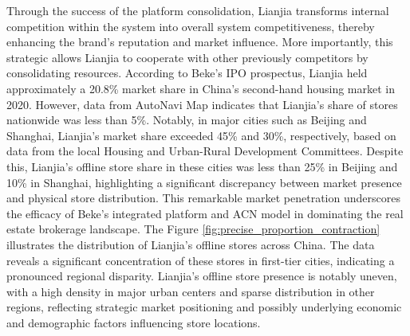\documentclass[11pt]{article}
\begin{document}
Through the success of the platform consolidation, Lianjia transforms internal competition within the system into overall system competitiveness, thereby enhancing the brand's reputation and market influence. More importantly, this strategic allows Lianjia to cooperate with other previously competitors by consolidating resources. According to Beke's IPO prospectus, Lianjia held approximately a 20.8\% market share in China's second-hand housing market in 2020. However, data from AutoNavi Map indicates that Lianjia's share of stores nationwide was less than 5\%. Notably, in major cities such as Beijing and Shanghai, Lianjia's market share exceeded 45\% and 30\%, respectively, based on data from the local Housing and Urban-Rural Development Committees. Despite this, Lianjia's offline store share in these cities was less than 25\% in Beijing and 10\% in Shanghai, highlighting a significant discrepancy between market presence and physical store distribution. This remarkable market penetration underscores the efficacy of Beke's integrated platform and ACN model in dominating the real estate brokerage landscape. The Figure \ref{fig:precise_proportion_contraction} illustrates the distribution of Lianjia's offline stores across China. The data reveals a significant concentration of these stores in first-tier cities, indicating a pronounced regional disparity. Lianjia's offline store presence is notably uneven, with a high density in major urban centers and sparse distribution in other regions, reflecting strategic market positioning and possibly underlying economic and demographic factors influencing store locations.  %





\end{document}
